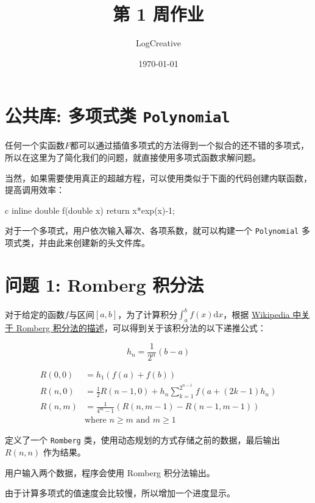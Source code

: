 \documentclass[12pt,a4paper]{article}
\begin{document}
\title{第 1 周作业}
\author{LogCreative}
\date{\today}

\maketitle
\tableofcontents

\section{公共库: 多项式类 \texttt{Polynomial}}

任何一个实函数$F$都可以通过插值多项式的方法得到一个拟合的还不错的多项式，所以在这里为了简化我们的问题，就直接使用多项式函数求解问题。

当然，如果需要使用真正的超越方程，可以使用类似于下面的代码创建内联函数，提高调用效率：
\begin{code}{c}
    inline double f(double x){ return x*exp(x)-1; }
\end{code}

对于一个多项式，用户依次输入幂次、各项系数，就可以构建一个 \texttt{Polynomial} 多项式类，并由此来创建新的头文件库。



\section{问题 1: Romberg 积分法}

对于给定的函数$f$与区间$[a,b]$，为了计算积分$\int_a^b f(x)\text{d}x$，根据 \href{https://en.wikipedia.org/wiki/Romberg\%27s_method}{Wikipedia 中关于 Romberg 积分法的描述}，可以得到关于该积分法的以下递推公式：

$$h_n=\frac{1}{2^n}(b-a)$$

\begin{align*}
    R(0,0) &= h_1 (f(a)+f(b)) \\ 
    R(n,0) &= \frac{1}{2}R(n-1,0) + h_n\sum_{k=1}^{2^{n-1}}f(a+(2k-1)h_n)\\
    R(n,m) &=\frac{1}{4^m -1}\left( R(n,m-1) - R(n-1,m-1) \right) \\ 
    &\text{where } n\geq m \text{ and } m\geq 1
\end{align*}


定义了一个 \texttt{Romberg} 类，使用动态规划的方式存储之前的数据，最后输出 $R(n,n)$ 作为结果。

用户输入两个数据，程序会使用 Romberg 积分法输出。

由于计算多项式的值速度会比较慢，所以增加一个进度显示。
\end{document}
